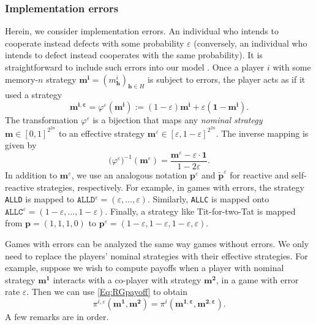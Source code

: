 \documentclass[9pt,twoside,lineno]{pnas-new}
\theoremstyle{plainCl1}
\theoremstyle{plainCl2}
\def\allc{\texttt{ALLC}}
\def\alld{\texttt{ALLD}}
\begin{document}
\subsubsection*{Implementation errors}
Herein, we consider implementation errors. 
An individual who intends to cooperate instead defects with some probability $\varepsilon$ (conversely, an individual who intends to defect instead cooperates with the same probability). 
It is straightforward to include such errors into our model \citep[see also][]{park:NComms:2022}. 
Once a player $i$ with some memory-$n$ strategy \(\mathbf{m^i} \!=\! (m^i_\mathbf{h})_{\mathbf{h}\in H}\) is subject to errors, the player acts as if it used a strategy
\begin{equation}
\mathbf{m^{i,\varepsilon}} = \varphi^\varepsilon(\mathbf{m^i}) := (1\!-\!\varepsilon)\mathbf{m^i} + \varepsilon (\mathbf{1}-\mathbf{m^i}). 
\end{equation}
The transformation $\varphi^\varepsilon$ is a bijection that maps any {\it nominal strategy} $\mathbf{m} \in [0,1]^{2^{2n}}$ to an effective strategy $\mathbf{m}^\varepsilon \in [\varepsilon,1\!-\!\varepsilon]^{2^{2n}}$. The inverse mapping is given by
\begin{equation}
\big(\varphi^\varepsilon\big)^{-1}(\mathbf{m}^\varepsilon) = \frac{\mathbf{m}^\varepsilon - \varepsilon\cdot \mathbf{1}}{1\!-\!2\varepsilon}. 
\end{equation}
In addition to $\mathbf{m}^\varepsilon$, we use an analogous notation $\mathbf{p}^\varepsilon$ and $\mathbf{\tilde p}^\varepsilon$ for reactive and self-reactive strategies, respectively. 
For example, in games with errors, the strategy \alld{} is mapped to $\alld^\varepsilon = (\varepsilon,\ldots,\varepsilon)$. Similarly, \allc{} is mapped onto $\allc^\varepsilon = (1\!-\!\varepsilon,\ldots,1\!-\!\varepsilon)$. Finally, a strategy like Tit-for-two-Tat is mapped from $\mathbf{p}=(1,1,1,0)$ to $\mathbf{p}^\varepsilon = (1\!-\!\varepsilon,1\!-\!\varepsilon,1\!-\!\varepsilon,\varepsilon)$. 

Games with errors can be analyzed the same way games without errors.
We only need to replace the players' nominal strategies with their effective strategies. 
For example, suppose we wish to compute payoffs when a player with nominal strategy $\mathbf{m^1}$ interacts with a co-player with strategy $\mathbf{m^2}$, in a game with error rate $\varepsilon$. Then we can use \eqref{Eq:RGpayoff} to obtain
\begin{equation}
\pi^{i,\varepsilon}(\mathbf{m^1},\mathbf{m^2}) = \pi^i(\mathbf{m^{1,\varepsilon}},\mathbf{m^{2,\varepsilon}}). 
\end{equation}
A few remarks are in order. 
\end{document}
